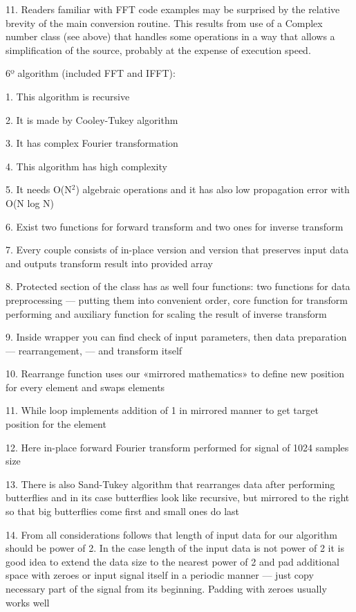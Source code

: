 \documentclass[12pt,a4paper,openany]{article}
\begin{document}
11.	Readers familiar with FFT code examples may be surprised by the relative brevity of the main conversion routine. This results from use of a Complex number class (see above) that handles some operations in a way that allows a simplification of the source, probably at the expense of execution speed.


6º algorithm (included FFT and IFFT):


1.	This algorithm is recursive


2.	It is made by Cooley-Tukey algorithm


3.	It has complex Fourier transformation


4.	This algorithm has high complexity


5.	It needs O(N$^{2}$) algebraic operations and it has also low propagation error with O(N log N)


6.	Exist two functions for forward transform and two ones for inverse transform


7.	Every couple consists of in-place version and version that preserves input data and outputs transform result into provided array


8.	Protected section of the class has as well four functions: two functions for data preprocessing — putting them into convenient order, core function for transform performing and auxiliary function for scaling the result of inverse transform


9.	Inside wrapper you can find check of input parameters, then data preparation — rearrangement, — and transform itself


10.	Rearrange function uses our «mirrored mathematics» to define new position for every element and swaps elements


11.	While loop implements addition of 1 in mirrored manner to get target position for the element


12.	Here in-place forward Fourier transform performed for signal of 1024 samples size


13.	There is also Sand-Tukey algorithm that rearranges data after performing butterflies and in its case butterflies look like recursive, but mirrored to the right so that big butterflies come first and small ones do last


14.	From all considerations follows that length of input data for our algorithm should be power of 2. In the case length of the input data is not power of 2 it is good idea to extend the data size to the nearest power of 2 and pad additional space with zeroes or input signal itself in a periodic manner — just copy necessary part of the signal from its beginning. Padding with zeroes usually works well
\end{document}
